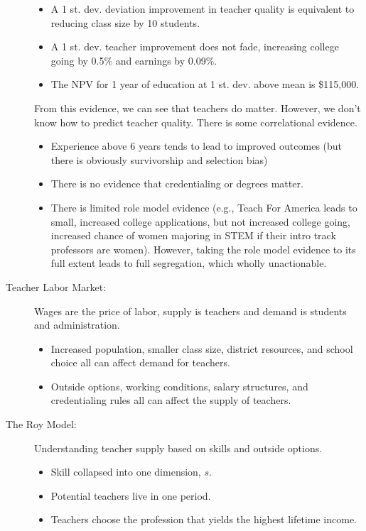 \documentclass[10pt]{extarticle}
\begin{document}
\begin{description}
\begin{itemize}
        \item A 1 st. dev. deviation improvement in teacher quality is equivalent to reducing class size by 10 students.
        \item A 1 st. dev. teacher improvement does not fade, increasing college going by 0.5\% and earnings by 0.09\%.
        \item The NPV for 1 year of education at 1 st. dev. above mean is \$115,000.
      \end{itemize}
      From this evidence, we can see that teachers do matter. However, we don't know how to predict teacher quality. There is some correlational evidence.
      \begin{itemize}
        \item Experience above 6 years tends to lead to improved outcomes (but there is obviously survivorship and selection bias)
        \item There is no evidence that credentialing or degrees matter.
        \item There is limited role model evidence (e.g., Teach For America leads to small, increased college applications, but not increased college going, increased chance of women majoring in STEM if their intro track professors are women). However, taking the role model evidence to its full extent leads to full segregation, which wholly unactionable.
      \end{itemize}
    \item[Teacher Labor Market:] Wages are the price of labor, supply is teachers and demand is students and administration.
      \begin{itemize}
        \item Increased population, smaller class size, district resources, and school choice all can affect demand for teachers.
        \item Outside options, working conditions, salary structures, and credentialing rules all can affect the supply of teachers.
      \end{itemize}
    \item[The Roy Model:] Understanding teacher supply based on skills and outside options. 
      \begin{itemize}
        \item Skill collapsed into one dimension, $s$.
        \item Potential teachers live in one period.
        \item Teachers choose the profession that yields the highest lifetime income.

\end{itemize}
\end{description}
\end{document}
